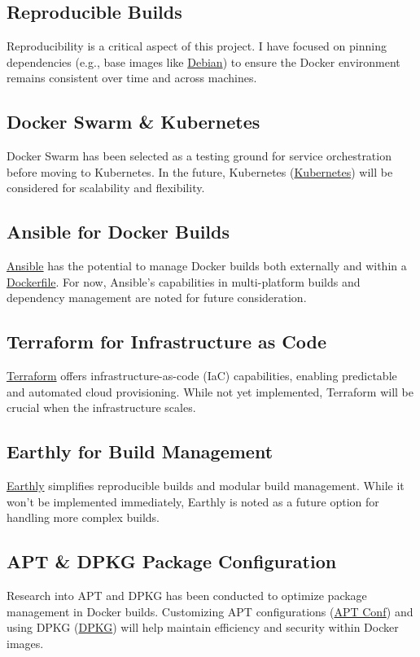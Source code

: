 \documentclass{article}
\begin{document}
\subsection{Reproducible Builds}
Reproducibility is a critical aspect of this project. I have focused on pinning dependencies (e.g., base images like \href{https://hub.docker.com/_/debian}{Debian}) to ensure the Docker environment remains consistent over time and across machines.

\subsection{Docker Swarm \& Kubernetes}
Docker Swarm has been selected as a testing ground for service orchestration before moving to Kubernetes. In the future, Kubernetes (\href{https://kubernetes.io/}{Kubernetes}) will be considered for scalability and flexibility.

\subsection{Ansible for Docker Builds}
\href{https://www.ansible.com/}{Ansible} has the potential to manage Docker builds both externally and within a \href{https://docs.docker.com/engine/reference/builder/}{Dockerfile}. For now, Ansible’s capabilities in multi-platform builds and dependency management are noted for future consideration.

\subsection{Terraform for Infrastructure as Code}
\href{https://www.terraform.io/}{Terraform} offers infrastructure-as-code (IaC) capabilities, enabling predictable and automated cloud provisioning. While not yet implemented, Terraform will be crucial when the infrastructure scales.

\subsection{Earthly for Build Management}
\href{https://earthly.dev/}{Earthly} simplifies reproducible builds and modular build management. While it won’t be implemented immediately, Earthly is noted as a future option for handling more complex builds.

\subsection{APT \& DPKG Package Configuration}
Research into APT and DPKG has been conducted to optimize package management in Docker builds. Customizing APT configurations (\href{https://manpages.ubuntu.com/manpages/focal/en/man5/apt.conf.5.html}{APT Conf}) and using DPKG (\href{https://manpages.ubuntu.com/manpages/focal/en/man1/dpkg.1.html}{DPKG}) will help maintain efficiency and security within Docker images.
\end{document}
